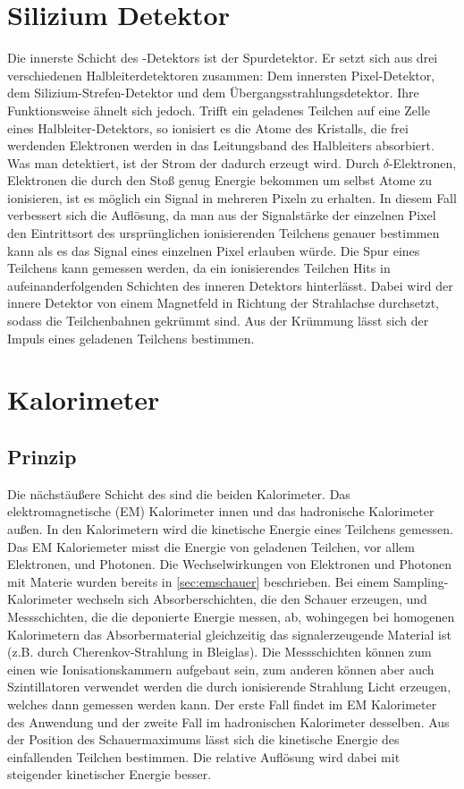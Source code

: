 \section{Silizium Detektor}
Die innerste Schicht des \atlas-Detektors ist der Spurdetektor. Er setzt sich aus drei verschiedenen Halbleiterdetektoren zusammen: Dem innersten Pixel-Detektor, dem Silizium-Strefen-Detektor und dem Übergangsstrahlungsdetektor. Ihre Funktionsweise ähnelt sich jedoch. Trifft ein geladenes Teilchen auf eine Zelle eines Halbleiter-Detektors, so ionisiert es die Atome des Kristalls, die frei werdenden Elektronen werden in das Leitungsband des Halbleiters absorbiert. Was man detektiert, ist der Strom der dadurch erzeugt wird. Durch $\delta$-Elektronen, Elektronen die durch den Stoß genug Energie bekommen um selbst Atome zu ionisieren, ist es möglich ein Signal in mehreren Pixeln zu erhalten. In diesem Fall verbessert sich die Auflösung, da man aus der Signalstärke der einzelnen Pixel den Eintrittsort des ursprünglichen ionisierenden Teilchens genauer bestimmen kann als es das Signal eines einzelnen Pixel erlauben würde. Die Spur eines Teilchens kann gemessen werden, da ein ionisierendes Teilchen Hits in aufeinanderfolgenden Schichten des inneren Detektors hinterlässt. Dabei wird der innere Detektor von einem Magnetfeld in Richtung der Strahlachse durchsetzt, sodass die Teilchenbahnen gekrümmt sind. Aus der Krümmung lässt sich der Impuls eines geladenen Teilchens bestimmen.

\section{Kalorimeter}\label{sec:calori}
\subsection{Prinzip}
Die nächstäußere Schicht des \atlas sind die beiden Kalorimeter. Das elektromagnetische (EM) Kalorimeter innen und das hadronische Kalorimeter außen. In den Kalorimetern wird die kinetische Energie eines Teilchens gemessen. Das EM Kaloriemeter misst die Energie von geladenen Teilchen, vor allem Elektronen, und Photonen. Die Wechselwirkungen von Elektronen und Photonen mit Materie wurden bereits in \ref{sec:emschauer} beschrieben. Bei einem Sampling-Kalorimeter wechseln sich Absorberschichten, die den Schauer erzeugen, und Messschichten, die die deponierte Energie messen, ab, wohingegen bei homogenen Kalorimetern das Absorbermaterial gleichzeitig das signalerzeugende Material ist (z.B. durch Cherenkov-Strahlung in Bleiglas). Die Messschichten können zum einen wie Ionisationskammern aufgebaut sein, zum anderen können aber auch Szintillatoren verwendet werden die durch ionisierende Strahlung Licht erzeugen, welches dann gemessen werden kann. Der erste Fall findet im EM Kalorimeter des \atlas Anwendung und der zweite Fall im hadronischen Kalorimeter desselben. Aus der Position des Schauermaximums lässt sich die kinetische Energie des einfallenden Teilchen bestimmen. 
Die relative Auflösung wird dabei mit steigender kinetischer Energie besser.
